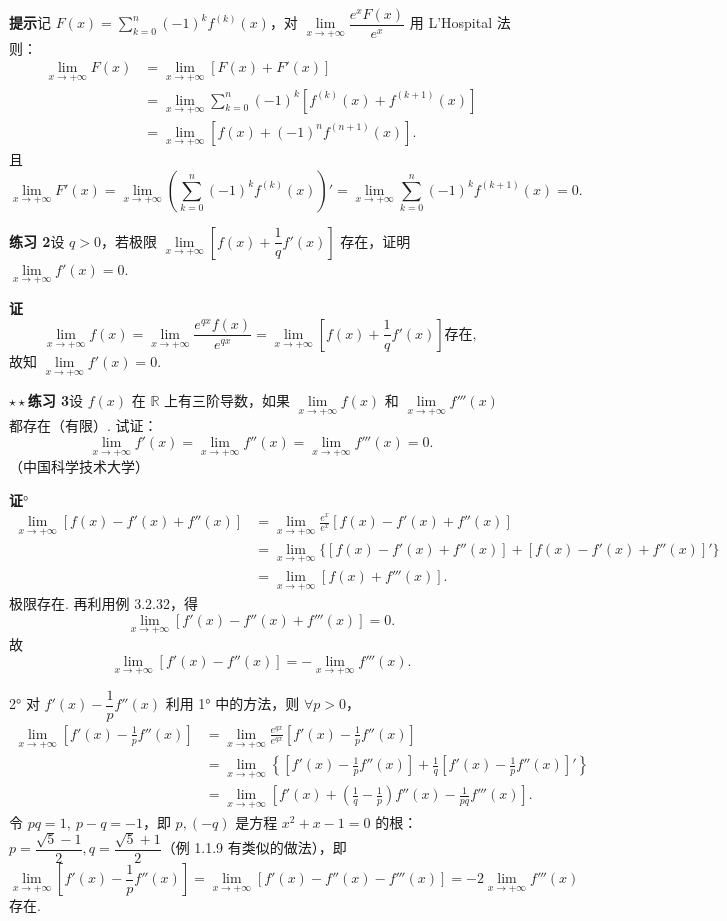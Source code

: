 \documentclass[UTF8, 12pt, fontset=fandol, oneside]{ctexart}
\begin{document}
\noindent\textbf{提示}\quad 记 $F(x)=\sum\limits_{k=0}^{n}(-1)^kf^{(k)}(x)$，对 $\lim\limits_{x\to+\infty}\dfrac{e^xF(x)}{e^x}$ 用 L'Hospital 法则：
\[
\begin{aligned}
  \lim_{x\to+\infty}F(x)
  &=\lim_{x\to+\infty}[F(x)+F'(x)] \\
  &=\lim_{x\to+\infty}
  \sum_{k=0}^{n}(-1)^k[f^{(k)}(x)+f^{(k+1)}(x)] \\
  &=\lim_{x\to+\infty}[f(x)+(-1)^nf^{(n+1)}(x)].
\end{aligned}
\]
且
\[
  \lim_{x\to+\infty}F'(x)
  =
  \lim_{x\to+\infty}\left(\sum_{k=0}^{n}(-1)^kf^{(k)}(x)\right)'
  =
  \lim_{x\to+\infty}\sum_{k=0}^{n}(-1)^kf^{(k+1)}(x)=0.
\]

\noindent\textbf{练习 2}\quad 设 $q>0$，若极限 $\lim\limits_{x\to+\infty}\left[f(x)+\dfrac{1}{q}f'(x)\right]$ 存在，证明 $\lim\limits_{x\to+\infty}f'(x)=0$.

\noindent\textbf{证}\quad
\[
  \lim_{x\to+\infty}f(x)
  =
  \lim_{x\to+\infty}\frac{e^{qx}f(x)}{e^{qx}}
  =
  \lim_{x\to+\infty}\left[f(x)+\frac{1}{q}f'(x)\right]\text{存在},
\]
故知 $\lim\limits_{x\to+\infty}f'(x)=0$.

\noindent\textbf{$\star\star$练习 3}\quad 设 $f(x)$ 在 $\mathbb{R}$ 上有三阶导数，如果 $\lim\limits_{x\to+\infty}f(x)$ 和 $\lim\limits_{x\to+\infty}f'''(x)$ 都存在（有限）. 试证：
\[
  \lim_{x\to+\infty}f'(x)=\lim_{x\to+\infty}f''(x)=\lim_{x\to+\infty}f'''(x)=0.
\]
（中国科学技术大学）

\noindent\textbf{证}°
\[
\begin{aligned}
  \lim_{x\to+\infty}[f(x)-f'(x)+f''(x)]
  &=
  \lim_{x\to+\infty}\frac{e^x}{e^x}[f(x)-f'(x)+f''(x)] \\
  &=
  \lim_{x\to+\infty}\{[f(x)-f'(x)+f''(x)]+[f(x)-f'(x)+f''(x)]'\} \\
  &=\lim_{x\to+\infty}[f(x)+f'''(x)].
\end{aligned}
\tag{1}
\]
极限存在. 再利用例 3.2.32，得
\[
  \lim_{x\to+\infty}[f'(x)-f''(x)+f'''(x)]=0.
\tag{2}
\]
故
\[
  \lim_{x\to+\infty}[f'(x)-f''(x)]
  =
  -\lim_{x\to+\infty}f'''(x).
\tag{3}
\]

2° 对 $f'(x)-\dfrac1p f''(x)$ 利用 1° 中的方法，则 $\forall p>0$，
\[
\begin{aligned}
  \lim_{x\to+\infty}\left[f'(x)-\frac1p f''(x)\right]
  &=
  \lim_{x\to+\infty}\frac{e^{qx}}{e^{qx}}\left[f'(x)-\frac1p f''(x)\right] \\
  &=
  \lim_{x\to+\infty}\left\{
  \left[f'(x)-\frac1p f''(x)\right]
  +\frac1q\left[f'(x)-\frac1p f''(x)\right]'\right\} \\
  &=
  \lim_{x\to+\infty}\left[f'(x)+\left(\frac1q-\frac1p\right)f''(x)-\frac1{pq}f'''(x)\right].
\end{aligned}
\]
令 $pq=1,\ p-q=-1$，即 $p,(-q)$ 是方程 $x^2+x-1=0$ 的根：$p=\dfrac{\sqrt5-1}{2},q=\dfrac{\sqrt5+1}{2}$（例 1.1.9 有类似的做法），即
\[
  \lim_{x\to+\infty}\left[f'(x)-\frac1p f''(x)\right]
  =
  \lim_{x\to+\infty}[f'(x)-f''(x)-f'''(x)]
  =
  -2\lim_{x\to+\infty}f'''(x)
\tag{4}
\]
存在.
\end{document}
